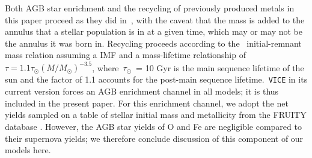 \documentclass[fleqn, usenatbib]{mnras}
\begin{document}
Both AGB star enrichment and the recycling of previously produced metals in 
this paper proceed as they did in~\citet{Johnson2020}, with the caveat that the 
mass is added to the annulus that a stellar population is in at a given time, 
which may or may not be the annulus it was born in. Recycling proceeds 
according to the~\citet{Kalirai2008} initial-remnant mass relation assuming a 
\citet{Kroupa2001} IMF and a mass-lifetime relationship of 
$\tau = 1.1\tau_\odot(M/M_\odot)^{-3.5}$, where~$\tau_\odot$~= 10 Gyr is the 
main sequence lifetime of the sun and the factor of 1.1 accounts for the 
post-main sequence lifetime.~\texttt{VICE} in its current version forces an AGB 
enrichment channel in all models; it is thus included in the present paper. For 
this enrichment channel, we adopt the net yields sampled on a table of stellar 
initial mass and metallicity from the FRUITY database \citep{Cristallo2011}. 
However, the AGB star yields of O and Fe are negligible compared to their 
supernova yields; we therefore conclude discussion of this component of our 
models here. 
\par 
\end{document}
